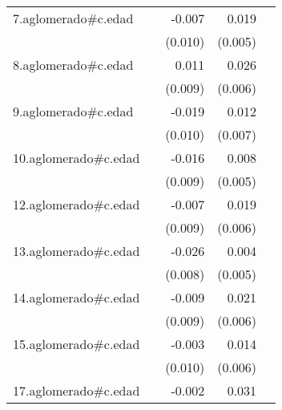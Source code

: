 {\begin{longtable}{l*{4}{D{.}{.}{-1}}}
\addlinespace
7.aglomerado#c.edad&                     &      -0.007         &       0.019\sym{***}&                     \\
            &                     &     (0.010)         &     (0.005)         &                     \\
\addlinespace
8.aglomerado#c.edad&                     &       0.011         &       0.026\sym{***}&                     \\
            &                     &     (0.009)         &     (0.006)         &                     \\
\addlinespace
9.aglomerado#c.edad&                     &      -0.019         &       0.012         &                     \\
            &                     &     (0.010)         &     (0.007)         &                     \\
\addlinespace
10.aglomerado#c.edad&                     &      -0.016         &       0.008         &                     \\
            &                     &     (0.009)         &     (0.005)         &                     \\
\addlinespace
12.aglomerado#c.edad&                     &      -0.007         &       0.019\sym{**} &                     \\
            &                     &     (0.009)         &     (0.006)         &                     \\
\addlinespace
13.aglomerado#c.edad&                     &      -0.026\sym{**} &       0.004         &                     \\
            &                     &     (0.008)         &     (0.005)         &                     \\
\addlinespace
14.aglomerado#c.edad&                     &      -0.009         &       0.021\sym{***}&                     \\
            &                     &     (0.009)         &     (0.006)         &                     \\
\addlinespace
15.aglomerado#c.edad&                     &      -0.003         &       0.014\sym{*}  &                     \\
            &                     &     (0.010)         &     (0.006)         &                     \\
\addlinespace
17.aglomerado#c.edad&                     &      -0.002         &       0.031\sym{***}&                     \\

\end{longtable}}
